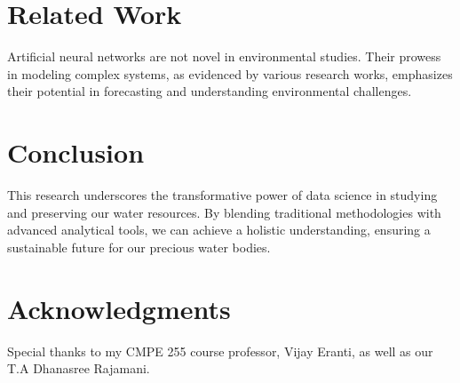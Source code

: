 \documentclass{article}
\begin{document}
\section{Related Work}
Artificial neural networks are not novel in environmental studies. Their prowess in modeling complex systems, as evidenced by various research works, emphasizes their potential in forecasting and understanding environmental challenges.

\section{Conclusion}
This research underscores the transformative power of data science in studying and preserving our water resources. By blending traditional methodologies with advanced analytical tools, we can achieve a holistic understanding, ensuring a sustainable future for our precious water bodies. 

\section*{Acknowledgments}
Special thanks to my CMPE 255 course professor, Vijay Eranti, as well as our T.A Dhanasree Rajamani.


\printbibliography
\end{document}

